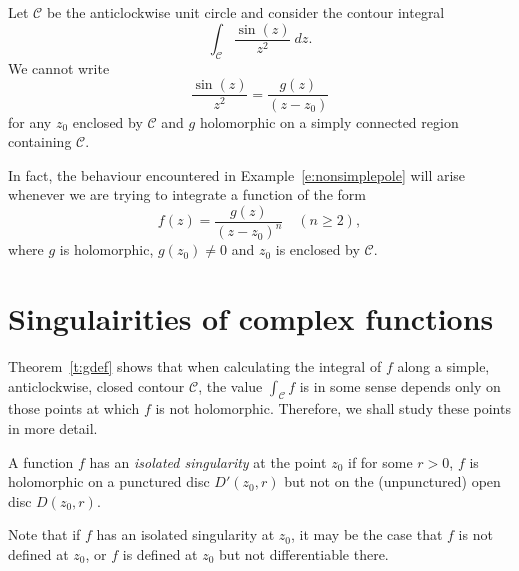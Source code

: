 \begin{example}
\label{e:nonsimplepole}
Let $\mathcal{C}$ be the anticlockwise unit circle and consider the contour integral
\[
\int_{\mathcal{C}} \frac{\sin (z)}{z^2}\ dz.
\]
We cannot write
\[
\frac{\sin (z)}{z^2} = \frac{g(z)}{(z-z_0)}
\]
for any $z_0$ enclosed by $\mathcal{C}$ and $g$ holomorphic on a simply connected region containing $\mathcal{C}$.
\end{example}

In fact, the behaviour encountered in Example~\ref{e:nonsimplepole} will arise whenever we are trying to integrate a function of the form
\[
f(z) = \frac{g(z)}{(z-z_0)^n} \quad (n \geq 2),
\]
where $g$ is holomorphic, $g(z_0) \neq 0$ and $z_0$ is enclosed by $\mathcal{C}$.
\section{Singulairities of complex functions}
Theorem~\ref{t:gdef} shows that when calculating the integral of $f$ along a simple, anticlockwise, closed contour $\mathcal{C}$, the value $\int_{\mathcal{C}} f$ is in some sense depends only on those points at which $f$ is not holomorphic.  Therefore, we shall study these points in more detail.

\begin{definition}
A function $f$ has an \emph{isolated singularity} at the point $z_0$ if for some $r>0$, $f$ is holomorphic on a punctured disc $D'(z_0,r)$ but not on the (unpunctured) open disc $D(z_0,r)$.
\end{definition}
Note that if $f$ has an isolated singularity at $z_0$, it may be the case that $f$ is not defined at $z_0$, or $f$ is defined at $z_0$ but not differentiable there.

